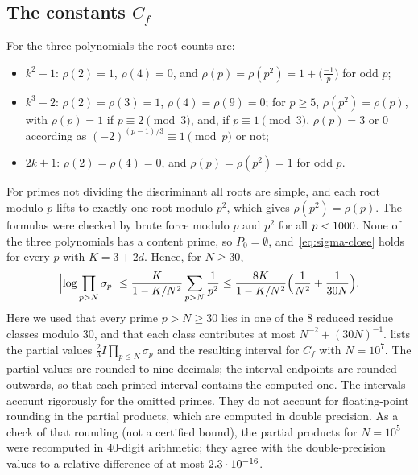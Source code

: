 \subsection{The constants \texorpdfstring{$C_f$}{C\_f}}\label{sec:num-constants}

For the three polynomials the root counts are:
\begin{itemize}
\item $k^2+1$: $\rho(2)=1$, $\rho(4)=0$, and $\rho(p)=\rho(p^2)=1+\bigl(\frac{-1}{p}\bigr)$ for odd $p$;
\item $k^3+2$: $\rho(2)=\rho(3)=1$, $\rho(4)=\rho(9)=0$; for $p\ge5$, $\rho(p^2)=\rho(p)$, with $\rho(p)=1$ if $p\equiv2\pmod 3$, and, if $p\equiv1\pmod3$, $\rho(p)=3$ or $0$ according as $(-2)^{(p-1)/3}\equiv1\pmod p$ or not;
\item $2k+1$: $\rho(2)=\rho(4)=0$, and $\rho(p)=\rho(p^2)=1$ for odd $p$.
\end{itemize}
For primes not dividing the discriminant all roots are simple, and each root modulo $p$ lifts to exactly one root modulo $p^2$, which gives $\rho(p^2)=\rho(p)$. The formulas were checked by brute force modulo $p$ and $p^2$ for all $p<1000$. None of the three polynomials has a content prime, so $P_0=\emptyset$, and~\eqref{eq:sigma-close} holds for every $p$ with $K=3+2d$. Hence, for $N\ge30$,
\[
\Bigl|\log\prod_{p>N}\sigma_p\Bigr|\le\frac{K}{1-K/N^2}\sum_{p>N}\frac1{p^2}\le\frac{8K}{1-K/N^2}\Bigl(\frac1{N^2}+\frac1{30N}\Bigr).
\]
Here we used that every prime $p>N\ge30$ lies in one of the $8$ reduced residue classes modulo $30$, and that each class contributes at most $N^{-2}+(30N)^{-1}$.  lists the partial values $\frac23I\prod_{p\le N}\sigma_p$ and the resulting interval for $C_f$ with $N=10^7$. The partial values are rounded to nine decimals; the interval endpoints are rounded outwards, so that each printed interval contains the computed one. The intervals account rigorously for the omitted primes. They do not account for floating-point rounding in the partial products, which are computed in double precision. As a check of that rounding (not a certified bound), the partial products for $N=10^5$ were recomputed in $40$-digit arithmetic; they agree with the double-precision values to a relative difference of at most $2.3\cdot 10^{-16}$.

\begin{table}[htbp]
\centering
\footnotesize\setlength{\tabcolsep}{3.5pt}

\caption{Partial Euler products $\frac23I\prod_{p\le N}\sigma_p$ and intervals for $C_f$. The row ``$t$ (formal)'' uses $\rho\equiv1$. The last row is Vaughan's constant~\eqref{eq:vaughan-c2} with $C_1$ truncated at $p\le N$; its limit equals that of the row above (\cref{rem:vaughan}).}
\label{tab:constants}
\end{table}

